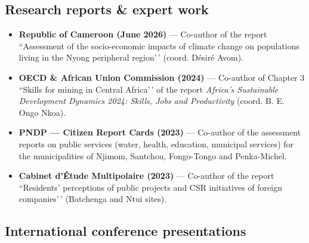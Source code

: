 \documentclass[
  french,
  10pt,
  letterpaper,
  DIV=11,
  numbers=noendperiod]{scrartcl}
\providecommand{\tightlist}{%
  \setlength{\itemsep}{0pt}\setlength{\parskip}{0pt}}
\begin{document}
\subsection{Research reports \& expert
work}\label{research-reports-expert-work}

\begin{itemize}
\tightlist
\item
  \textbf{Republic of Cameroon (June 2026)} --- Co-author of the report
  ``Assessment of the socio-economic impacts of climate change on
  populations living in the Nyong peripheral region'\,' (coord. Désiré
  Avom).
\item
  \textbf{OECD \& African Union Commission (2024)} --- Co-author of
  Chapter 3 ``Skills for mining in Central Africa'\,' of the report
  \textit{Africa's Sustainable Development Dynamics 2024: Skills, Jobs and Productivity}
  (coord. B. E. Ongo Nkoa).
\item
  \textbf{PNDP --- Citizen Report Cards (2023)} --- Co-author of the
  assessment reports on public services (water, health, education,
  municipal services) for the municipalities of Njimom, Santchou,
  Fongo-Tongo and Penka-Michel.
\item
  \textbf{Cabinet d'Étude Multipolaire (2023)} --- Co-author of the
  report ``Residents' perceptions of public projects and CSR initiatives
  of foreign companies'\,' (Batchenga and Ntui sites).
\end{itemize}

\subsection{International conference
presentations}\label{international-conference-presentations}
\end{document}
